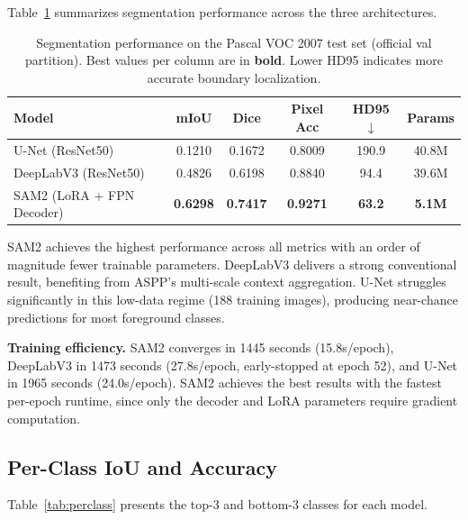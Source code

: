 \documentclass[11pt]{article}
\begin{document}
Table~\ref{tab:overall} summarizes segmentation performance across the three architectures.

\begin{table}[H]
\centering
\caption{Segmentation performance on the Pascal VOC 2007 test set (official val partition). Best values per column are in \textbf{bold}. Lower HD95 indicates more accurate boundary localization.}
\label{tab:overall}
\begin{tabular}{lccccc}
\toprule
Model & mIoU & Dice & Pixel Acc & HD95$\downarrow$ & Params \\
\midrule
U-Net (ResNet50) & 0.1210 & 0.1672 & 0.8009 & 190.9 & 40.8M \\
DeepLabV3 (ResNet50) & 0.4826 & 0.6198 & 0.8840 & 94.4 & 39.6M \\
SAM2 (LoRA + FPN Decoder) & \textbf{0.6298} & \textbf{0.7417} & \textbf{0.9271} & \textbf{63.2} & \textbf{5.1M} \\
\bottomrule
\end{tabular}
\end{table}

SAM2 achieves the highest performance across all metrics with an order of magnitude fewer trainable parameters. DeepLabV3 delivers a strong conventional result, benefiting from ASPP's multi-scale context aggregation. U-Net struggles significantly in this low-data regime (188 training images), producing near-chance predictions for most foreground classes.

\textbf{Training efficiency.} SAM2 converges in 1445 seconds (15.8s/epoch), DeepLabV3 in 1473 seconds (27.8s/epoch, early-stopped at epoch 52), and U-Net in 1965 seconds (24.0s/epoch). SAM2 achieves the best results with the fastest per-epoch runtime, since only the decoder and LoRA parameters require gradient computation.

\subsection{Per-Class IoU and Accuracy}

Table~\ref{tab:perclass} presents the top-3 and bottom-3 classes for each model.
\end{document}
